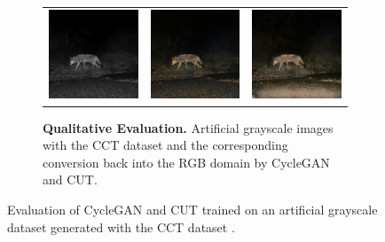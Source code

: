 \documentclass[a4paper,11pt, DIV=12]{scrartcl}
\begin{document}
\begin{figure}[ht]
\begin{subfigure}{0.63\textwidth}
\begin{tabularx}{1\textwidth}{>{\centering\arraybackslash}X >{\centering\arraybackslash}X >{\centering\arraybackslash}X}
         \includegraphics{58782b4f-23d2-11e8-a6a3-ec086b02610b_real.png} & \includegraphics{58782b4f-23d2-11e8-a6a3-ec086b02610b_cycle_gan.png} & \includegraphics{58782b4f-23d2-11e8-a6a3-ec086b02610b_cut.png}
      \end{tabularx}
      \caption{
         \textbf{Qualitative Evaluation.} Artificial grayscale images with the CCT dataset \cite{caltech} and the corresponding conversion back into the RGB domain by CycleGAN and CUT.
      }
      \label{fig:gray-qual}
   \end{subfigure}
   \caption{
      Evaluation of CycleGAN and CUT trained on an artificial grayscale dataset generated with the CCT dataset \cite{caltech}.
   }
\end{figure}
\end{document}
